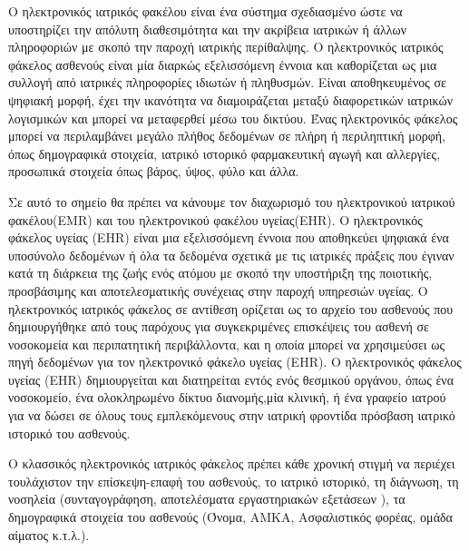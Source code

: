 		Ο ηλεκτρονικός ιατρικός φακέλου είναι ένα σύστημα σχεδιασμένο ώστε να υποστηρίζει την απόλυτη διαθεσιμότητα και την ακρίβεια ιατρικών ή άλλων πληροφοριών με σκοπό την παροχή ιατρικής περίθαλψης. Ο ηλεκτρονικός ιατρικός φάκελος ασθενούς είναι μία διαρκώς εξελισσόμενη έννοια και καθορίζεται ως μια συλλογή από ιατρικές πληροφορίες ιδιωτών ή πληθυσμών. Είναι αποθηκευμένος σε ψηφιακή μορφή, έχει την ικανότητα να διαμοιράζεται μεταξύ διαφορετικών ιατρικών λογισμικών και μπορεί να μεταφερθεί μέσω του δικτύου. Ένας ηλεκτρονικός φάκελος μπορεί να περιλαμβάνει μεγάλο πλήθος δεδομένων σε πλήρη ή περιληπτική μορφή, όπως δημογραφικά στοιχεία, ιατρικό ιστορικό φαρμακευτική αγωγή και αλλεργίες, προσωπικά στοιχεία όπως βάρος, ύψος, φύλο και άλλα.
		
		Σε αυτό το σημείο θα πρέπει να κάνουμε τον διαχωρισμό του ηλεκτρονικού ιατρικού φακέλου(EMR) και του ηλεκτρονικού φακέλου υγείας(EHR). O ηλεκτρονικός φάκελος υγείας (EHR) είναι μια εξελισσόμενη έννοια 
που αποθηκεύει ψηφιακά ένα υποσύνολο δεδομένων ή όλα τα δεδομένα σχετικά με τις ιατρικές πράξεις που έγιναν κατά τη διάρκεια της ζωής ενός ατόμου με σκοπό την υποστήριξη της ποιοτικής, προσβάσιμης και αποτελεσματικής συνέχειας στην παροχή υπηρεσιών υγείας. Ο ηλεκτρονικός ιατρικός φάκελος σε αντίθεση ορίζεται ως το αρχείο του ασθενούς που δημιουργήθηκε από τους παρόχους για συγκεκριμένες επισκέψεις του ασθενή σε νοσοκομεία και περιπατητική περιβάλλοντα, και η οποία μπορεί να χρησιμεύσει ως πηγή δεδομένων για τον ηλεκτρονικό φάκελο υγείας (EHR). Ο ηλεκτρονικός φάκελος υγείας (EHR) δημιουργείται και διατηρείται εντός ενός θεσμικού οργάνου, όπως ένα νοσοκομείο, ένα ολοκληρωμένο δίκτυο διανομής,μία κλινική, ή ένα γραφείο ιατρού για να δώσει σε όλους τους εμπλεκόμενους στην ιατρική φροντίδα πρόσβαση ιατρικό ιστορικό του ασθενούς.
	
	
		Ο κλασσικός ηλεκτρονικός ιατρικός φάκελος πρέπει κάθε χρονική στιγμή να περιέχει τουλάχιστον την επίσκεψη-επαφή του ασθενούς, το ιατρικό ιστορικό, τη διάγνωση, τη νοσηλεία (συνταγογράφηση, αποτελέσματα εργαστηριακών εξετάσεων ), τα δημογραφικά στοιχεία του ασθενούς (Όνομα, ΑΜΚΑ, Ασφαλιστικός φορέας, ομάδα αίματος κ.τ.λ.).


